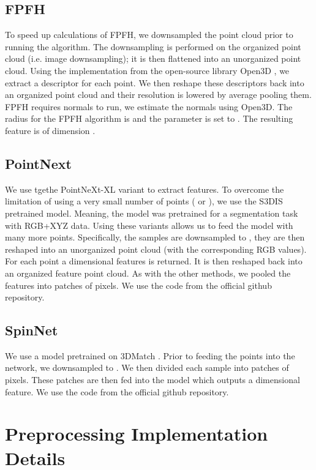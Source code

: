 \documentclass{article}
\begin{document}
\subsection{FPFH}
To speed up calculations of FPFH, we downsampled the point cloud prior to running the algorithm. The downsampling is performed on the organized point cloud (i.e. image downsampling); it is then flattened into an unorganized point cloud. Using the implementation from the open-source library Open3D \cite{open3d}, we extract a descriptor for each point. We then reshape these descriptors back into an organized point cloud and their resolution is lowered by average pooling them. FPFH requires normals to run, we estimate the normals using Open3D. The radius for the FPFH algorithm is  and the  parameter is set to . The resulting feature is of dimension .

\subsection{PointNext}
We use tgethe PointNeXt-XL variant to extract features. To overcome the limitation of using a very small number of points ( or ), we use the S3DIS \cite{s3dis} pretrained model. Meaning, the model was pretrained for a segmentation task with RGB+XYZ data. Using these variants allows us to feed the model with many more points. Specifically, the samples are downsampled to , they are then reshaped into an unorganized point cloud (with the corresponding RGB values). For each point a  dimensional features is returned. It is then reshaped back into an organized feature point cloud. As with the other methods, we pooled the features into  patches of  pixels. We use the code from the official github repository.

\subsection{SpinNet}
We use a model pretrained on 3DMatch \cite{3dmatch}. Prior to feeding the points into the network, we downsampled to . We then divided each sample into  patches of  pixels. These patches are then fed into the model which outputs a  dimensional feature. We use the code from the official github repository.

\section{Preprocessing Implementation Details}
\label{app:preprocessing_impl}
\end{document}
